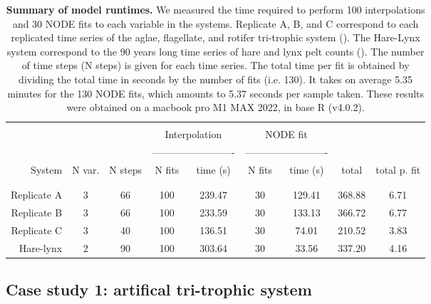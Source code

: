 \documentclass[11pt, oneside]{article}
\begin{document}
\begin{table}[H]
\begin{center}
\caption{
\textbf{Summary of model runtimes.}
We measured the time required to perform 100 interpolations and 30 NODE fits to each variable in the systems.
Replicate A, B, and C correspond to each replicated time series of the aglae, flagellate, and rotifer tri-trophic system (\cite{Hiltunen2013}).
The Hare-Lynx system correspond to the 90 years long time series of hare and lynx pelt counts (\cite{Odum1972}).
The number of time steps (N steps) is given for each time series. 
The total time per fit is obtained by dividing the total time in seconds by the number of fits (i.e. 130).
It takes on average 5.35 minutes for the 130 NODE fits, which amounts to 5.37 seconds per sample taken. 
These results were obtained on a macbook pro M1 MAX 2022, in base R (v4.0.2).
}
\begin{tabular}{rcccccccc}
\hline
& \\
& & & \multicolumn{2}{c}{Interpolation} & \multicolumn{2}{c}{NODE fit} & &  \\
& & & \multicolumn{2}{c}{-------------------------} & \multicolumn{2}{c}{-------------------------} & &  \\
System & N var. & N steps & N fits & time (s) & N fits & time (s) & total & total p. fit \\
& \\
\hline
& \\
Replicate A & 3 & 66 &  100 & 239.47 & 30 & 129.41 & 368.88 & 6.71 \\
Replicate B & 3 & 66 &  100 & 233.59 & 30 & 133.13 & 366.72 & 6.77 \\
Replicate C & 3 & 40 &  100 & 136.51 & 30 &  74.01 & 210.52 & 3.83 \\
Hare-lynx   & 2 & 90 &  100 & 303.64 & 30 &  33.56 & 337.20 & 4.16 \\
\end{tabular}
\end{center}
\end{table}
\newpage

\subsection{Case study 1: artifical tri-trophic system}
\end{document}
